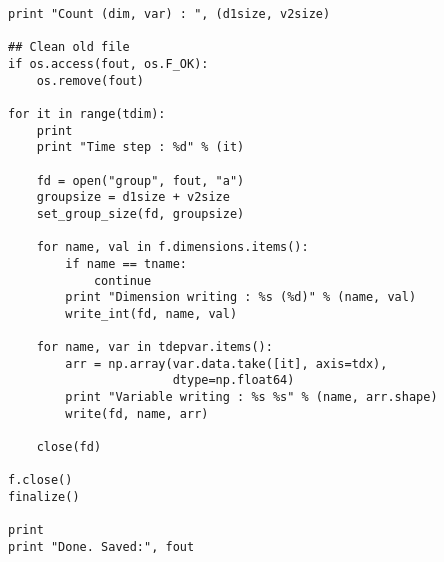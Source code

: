 \begin{lstlisting}[language=ADIOS-python,caption={ncdf2bp.py. An example Python/Numpy wrapper code for converting a NetCDF file to a ADIOS BP file},label={},]
print "Count (dim, var) : ", (d1size, v2size)

## Clean old file
if os.access(fout, os.F_OK):
    os.remove(fout)

for it in range(tdim):
    print 
    print "Time step : %d" % (it)
    
    fd = open("group", fout, "a")
    groupsize = d1size + v2size
    set_group_size(fd, groupsize)

    for name, val in f.dimensions.items():
        if name == tname:
            continue
        print "Dimension writing : %s (%d)" % (name, val)
        write_int(fd, name, val)
        
    for name, var in tdepvar.items():
        arr = np.array(var.data.take([it], axis=tdx),
                       dtype=np.float64)
        print "Variable writing : %s %s" % (name, arr.shape)
        write(fd, name, arr)

    close(fd)
    
f.close()
finalize()

print
print "Done. Saved:", fout
    
\end{lstlisting}



